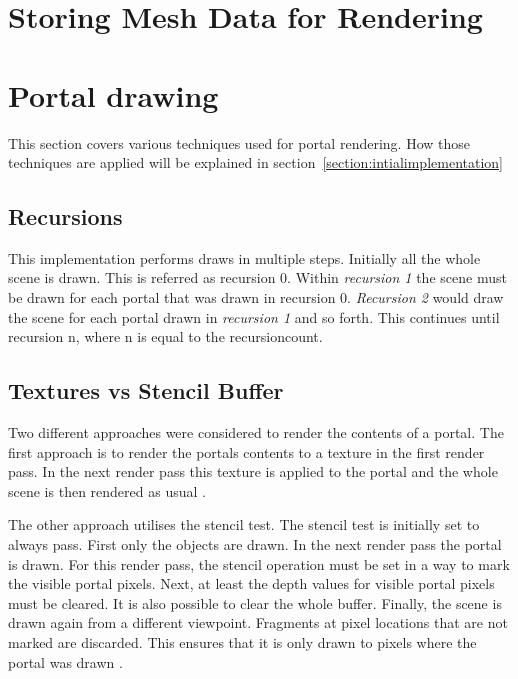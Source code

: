 \section{Storing Mesh Data for Rendering}


\section{Portal drawing}
\label{section:portaldrawing}

This section covers various techniques used for portal rendering. How those techniques are applied will be explained in section~\ref{section:intialimplementation}

\subsection{Recursions}


This implementation performs draws in multiple steps. Initially all the whole scene is drawn. This is referred as recursion 0. Within \textit{recursion 1} the scene must be drawn for each portal that was drawn in recursion 0. \textit{Recursion 2} would draw the scene for each portal drawn in \textit{recursion 1} and so forth. This continues until recursion n, where n is equal to the \gls{recursioncount}.


\subsection{Textures vs Stencil Buffer}
\label{section:textursVsStencil}
Two different approaches were considered to render the contents of a portal. The first approach is to render the portals contents to a texture in the first render pass. In the next render pass this texture is applied to the portal and the whole scene is then rendered as usual \cite{schmalstieg:1999:sewing, lecture:portalProblems}.

The other approach utilises the stencil test. The stencil test is initially set to always pass. First only the objects are drawn. In the next render pass the portal is drawn. For this render pass, the stencil operation must be set in a way to mark the visible portal pixels. Next, at least the depth values for visible portal pixels must be cleared. It is also possible to clear the whole buffer. Finally, the scene is drawn again from a different viewpoint. Fragments at pixel locations that are not marked are discarded. This ensures that it is only drawn to pixels where the portal was drawn \cites{schmalstieg:1999:sewing, lowe:2005:technique, lecture:portalProblems}.


